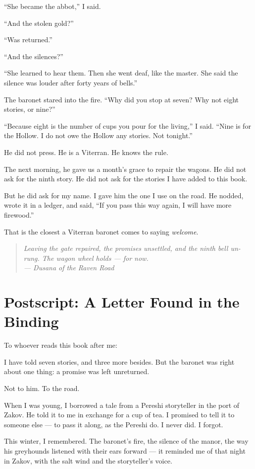 \documentclass[10pt,twoside]{book}
\newcommand{\dusana}[1]{\begin{quote}\itshape #1 \\ --- Dusana of the Raven Road\end{quote}}
\begin{document}
``She became the abbot,'' I said.

``And the stolen gold?''

``Was returned.''

``And the silences?''

``She learned to hear them. Then she went deaf, like the master. She said the silence was louder after forty years of bells.''

The baronet stared into the fire. ``Why did you stop at seven? Why not eight stories, or nine?''

``Because eight is the number of cups you pour for the living,'' I said. ``Nine is for the Hollow. I do not owe the Hollow any stories. Not tonight.''

He did not press. He is a Viterran. He knows the rule.

The next morning, he gave us a month's grace to repair the wagons. He did not ask for the ninth story. He did not ask for the stories I have added to this book.

But he did ask for my name. I gave him the one I use on the road. He nodded, wrote it in a ledger, and said, ``If you pass this way again, I will have more firewood.''

That is the closest a Viterran baronet comes to saying \textit{welcome}.

\dusana{Leaving the gate repaired, the promises unsettled, and the ninth bell un-rung. The wagon wheel holds --- for now.}

\chapter*{Postscript: A Letter Found in the Binding}

To whoever reads this book after me:

I have told seven stories, and three more besides. But the baronet was right about one thing: a promise was left unreturned.

Not to him. To the road.

When I was young, I borrowed a tale from a Pereshi storyteller in the port of Zakov. He told it to me in exchange for a cup of tea. I promised to tell it to someone else --- to pass it along, as the Pereshi do. I never did. I forgot.

This winter, I remembered. The baronet's fire, the silence of the manor, the way his greyhounds listened with their ears forward --- it reminded me of that night in Zakov, with the salt wind and the storyteller's voice.
\end{document}
